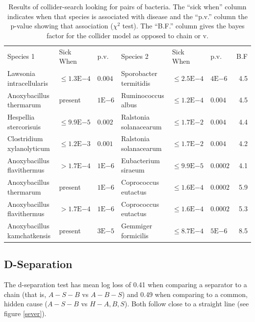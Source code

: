 \documentclass[letterpaper]{article}
\begin{document}
\begin{table}[t]
  \begin{tabularx}{\textwidth}{llXlllr}
Species 1 & Sick When & p.v. & Species 2 & Sick When & p.v. & B.F \\
    Lawsonia intracellularis & $\leq1.3\mathrm{E}{-4}$ & $0.004$ & Sporobacter termitidis & $\leq2.5\mathrm{E}{-4}$ & $4\mathrm{E}{-6}$ & 4.5 \\
Anoxybacillus thermarum & present & $1\mathrm{E}{-6}$ & Ruminococcus albus & $\leq1.2\mathrm{E}{-4}$ & $0.004$ & 4.5 \\
Hespellia stercorisuis & $\leq9.9\mathrm{E}{-5}$ & $0.002$ & Ralstonia solanacearum & $\leq1.7\mathrm{E}{-2}$ & $0.004$ & 4.4 \\
Clostridium xylanolyticum & $\leq1.2\mathrm{E}{-3}$ & $0.001$ & Ralstonia solanacearum & $\leq1.7\mathrm{E}{-2}$ & $0.004$ & 4.2 \\
Anoxybacillus flavithermus & $>1.7\mathrm{E}{-4}$ & $1\mathrm{E}{-6}$ & Eubacterium siraeum & $\leq9.9\mathrm{E}{-5}$ & $0.0002$ & 4.1 \\
Anoxybacillus thermarum & present & $1\mathrm{E}{-6}$ & Coprococcus eutactus & $\leq1.6\mathrm{E}{-4}$ & $0.0002$ & 5.9 \\
Anoxybacillus flavithermus & $>1.7\mathrm{E}{-4}$ & $1\mathrm{E}{-6}$ & Coprococcus eutactus & $\leq1.6\mathrm{E}{-4}$ & $0.0002$ & 5.3 \\
Anoxybacillus kamchatkensis & present & $3\mathrm{E}{-5}$ & Gemmiger formicilis & $\leq8.7\mathrm{E}{-4}$ & $5\mathrm{E}{-6}$ & 8.5 \\
  \end{tabularx}
  \caption{Results of collider-search looking for pairs of bacteria.
    The ``sick when''  column indicates when that species is
    associated with disease and the ``p.v.'' column the p-value
    showing that association ($\chi^2$ test).  The ``B.F.'' column
    gives the bayes factor for the collider model as opposed to chain
    or v.}
  \label{two_bact_tab}
\end{table}

\subsection{D-Separation}

The d-separation test has mean log loss of 0.41 when comparing a
separator to a chain (that is, $A-S-B$ vs $A-B-S$) and 0.49 when
comparing to a common, hidden cause ($A-S-B$ vs $H-A,B,S$).  Both
follow close to a straight line (see figure \ref{sever}).
\end{document}
